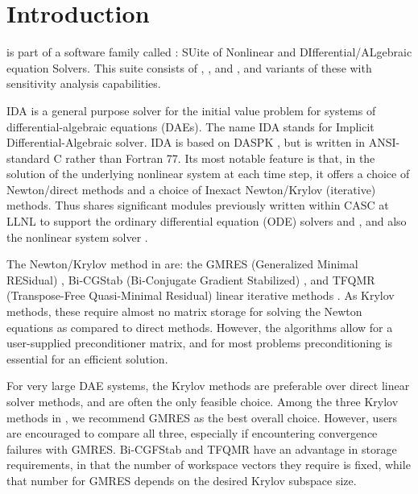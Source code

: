 \chapter{Introduction}\label{s:intro}

{\ida} is part of a software family called {\sundials}: 
SUite of Nonlinear and DIfferential/ALgebraic equation Solvers.  
This suite consists of {\cvode}, {\kinsol}, and {\ida}, and variants of these
with sensitivity analysis capabilities.

IDA is a general purpose solver for the initial value problem for
systems of differential-algebraic equations (DAEs).  The name IDA
stands for Implicit Differential-Algebraic solver.  IDA is based on
DASPK \cite{BHP:94,BHP:98}, but is written in ANSI-standard C
rather than Fortran 77.  Its most notable feature is that, in the
solution of the underlying nonlinear system at each time step, it offers
a choice of Newton/direct methods and a choice of Inexact Newton/Krylov
(iterative) methods.  Thus {\ida} shares significant modules previously
written within CASC at LLNL to support the ordinary differential
equation (ODE) solvers {\cvode} \cite{cvode2.2.0_ug,CoHi:96} and {\pvode}
\cite{ByHi:98,ByHi:99}, and also the nonlinear system solver {\kinsol}
\cite{kinsol2.2.0_ug}.

The Newton/Krylov method in {\ida} are:
the GMRES (Generalized Minimal RESidual) \cite{SaSc:86},
Bi-CGStab (Bi-Conjugate Gradient Stabilized) \cite{}, and
TFQMR (Transpose-Free Quasi-Minimal Residual) linear iterative methods
\cite{}.  As Krylov methods, these require almost no matrix storage
for solving the Newton equations as compared to direct methods.
However, the algorithms allow for a user-supplied preconditioner
matrix, and for most problems preconditioning is essential for an
efficient solution.

For very large DAE systems, the Krylov methods are preferable over
direct linear solver methods, and are often the only feasible choice.
Among the three Krylov methods in {\ida}, we recommend GMRES as the
best overall choice.  However, users are encouraged to compare all
three, especially if encountering convergence failures with GMRES.
Bi-CGFStab and TFQMR have an advantage in storage requirements, in
that the number of workspace vectors they require is fixed, while that
number for GMRES depends on the desired Krylov subspace size.

